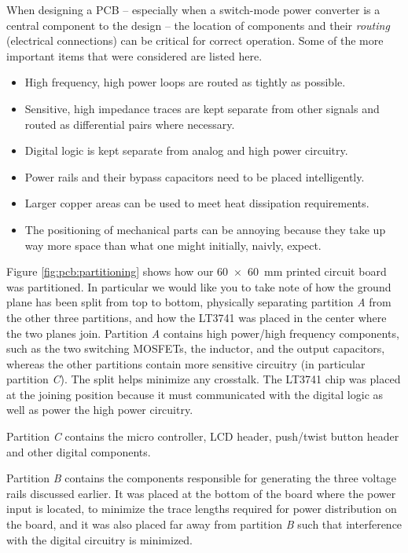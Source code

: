 When designing a PCB --  especially  when  a  switch-mode  power  converter is a
central  component  to  the  design  --  the  location  of  components and their
\emph{routing} (electrical connections) can be  critical  for correct operation.
Some  of  the  more  important  items  that  were  considered  are  listed here.
\begin{itemize}
    \item
        High frequency, high power loops are routed as tightly as possible.
    \item
        Sensitive, high impedance traces are kept separate from other signals
        and routed as differential pairs where necessary.
    \item
        Digital logic is kept separate from analog and high power circuitry.
    \item
        Power rails and their bypass capacitors need to be placed intelligently.
    \item
        Larger copper areas can be used to meet heat dissipation requirements.
    \item
        The positioning of mechanical parts can be annoying because they take up
        way more space than what one might initially, naivly, expect.
\end{itemize}

Figure \ref{fig:pcb:partitioning} shows how our \SI{60x60}{\milli\meter} printed
circuit board was partitioned. In particular we  would  like you to take note of
how the ground plane has been split from  top  to  bottom, physically separating
partition  \emph{A}  from the other three partitions, and  how  the  LT3741  was
placed in the center where the two planes join. Partition \emph{A} contains high
power/high  frequency  components,  such  as  the  two  switching  MOSFETs,  the
inductor, and the output capacitors, whereas  the  other partitions contain more
sensitive circuitry (in particular partition \emph{C}). The split helps minimize
any crosstalk. The LT3741 chip was placed at the  joining  position  because  it
must  communicated  with  the  digital logic as well as  power  the  high  power
circuitry.

Partition \emph{C} contains the micro  controller, LCD header, push/twist button
header and other digital components.

Partition \emph{B} contains the components  responsible for generating the three
voltage rails discussed earlier. It was placed at  the bottom of the board where
the  power input is located, to minimize the trace lengths  required  for  power
distribution on  the  board,  and  it  was  also  placed far away from partition
\emph{B}  such  that  interference  with  the  digital  circuitry  is minimized.

